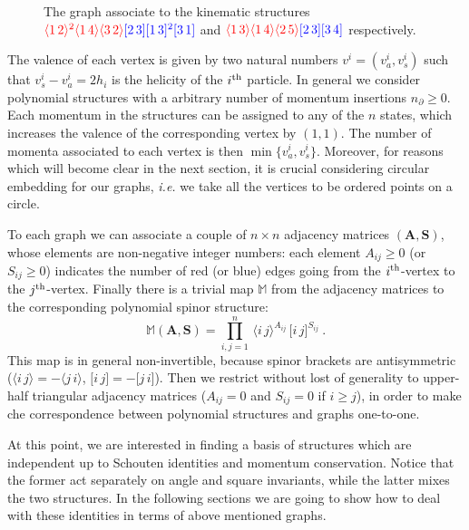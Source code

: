 \documentclass[aps,prd,nofootinbib,twocolumn,10pt]{revtex4-2}
\newcommand{\agl}[2]{\langle#1\, #2 \rangle}
\newcommand{\sqr}[2]{\lbrack #1\, #2 \rbrack}
\begin{document}
\begin{figure}[t]
\begin{center}
	    \end{center}
    \caption{The graph associate to the kinematic structures $\textcolor{red}{\agl{1}{2}^2 \agl{1}{4} \agl{3}{2}} \textcolor{blue}{\sqr{2}{3}\sqr{1}{3}^2 \sqr{3}{1}}$ and $\textcolor{red}{\agl{1}{3} \agl{1}{4} \agl{2}{5}} \textcolor{blue}{\sqr{2}{3}\sqr{3}{4}}$ respectively.}
	\label{fig:2graphexample}
\end{figure}

The valence of each vertex is given by two natural numbers $v^{i}=(v^i_a,v^{i}_s)$ such that $v^i_s-v^i_a =2 h_i$ is the helicity of the $i^{\rm th}$ particle. In general we consider polynomial structures with a arbitrary number of momentum insertions $n_\partial \geq 0$. Each momentum in the structures can be assigned to any of the $n$ states, which increases the valence of the corresponding vertex by $(1,1)$. The number of momenta associated to each vertex is then $\min\{v^i_a,v^i_s\}$. Moreover, for reasons which will become clear in the next section, it is crucial considering circular embedding for our graphs, \textit{i.e.} we take all the vertices to be  ordered points on a circle. 

To each graph we can associate a couple of $n\times n$ adjacency matrices $(\mathbf{A},\mathbf{S})$, whose elements are non-negative integer numbers: each element $A_{i j}\geq 0$ (or $S_{i j}\geq 0$) indicates the number of red (or blue) edges going from the $i^{\rm th}$-vertex to the $j^{\rm th}$-vertex. Finally there is a trivial map $\mathbb{M}$ from the adjacency matrices to the corresponding polynomial spinor structure:
\begin{equation}
	\mathbb{M}(\mathbf{A},\mathbf{S}) = \prod_{i,j=1}^n\, \agl{i}{j}^{A_{i j}}\, \sqr{i}{j}^{S_{i j}}\ .
\end{equation}
This map is in general non-invertible, because spinor brackets are antisymmetric ($\agl{i}{j}=-\agl{j}{i}$, $\sqr{i}{j} = - \sqr{j}{i}$). Then we restrict without lost of generality to upper-half triangular adjacency matrices ($A_{i j} = 0$ and $S_{i j}= 0$ if $i \geq j$), in order to make che correspondence between polynomial structures and graphs one-to-one.

At this point, we are interested in finding a basis of structures which are independent up to Schouten identities and momentum conservation. Notice that the former act separately on angle and square invariants, while the latter mixes the two structures. In the following sections we are going to show how to deal with these identities in terms of above mentioned graphs.
\end{document}
